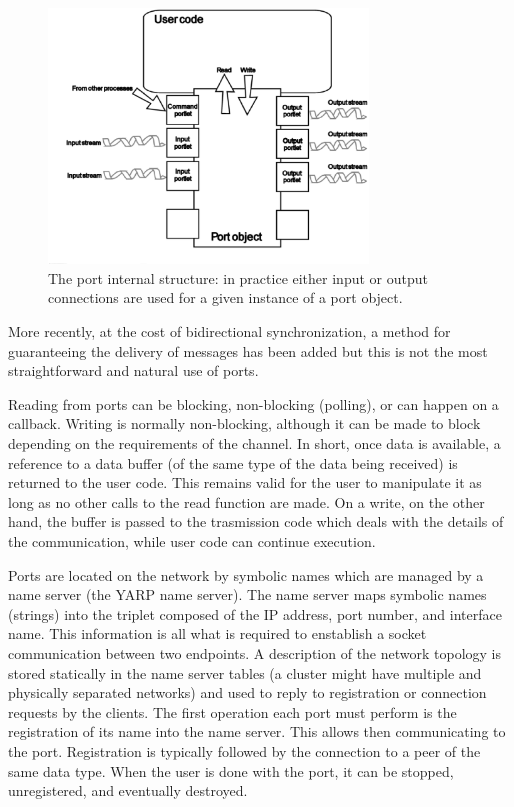 \begin{figure}
	\centering
		\includegraphics[width=8.5cm]{port.eps}
	\caption{The port internal structure: in practice either input or output connections
	are used for a given instance of a port object.}
	\label{fig:port}
\end{figure}

More recently, at the cost of bidirectional synchronization, a method for guaranteeing
the delivery of messages has been added but this is not the most straightforward and
natural use of ports.

Reading from ports can be blocking, non-blocking (polling), or can happen on a callback.
Writing is normally non-blocking, although it can be made to block depending on the requirements of the channel. In short, once data is available, a reference to a data
buffer (of the same type of the data being received) is returned to the user code. This
remains valid for the user to manipulate it as long as no other calls to the read function
are made. 
On a write, on the other hand, the buffer is passed to the trasmission code which deals
with the details of the communication, while user code can continue execution.

Ports are located on the network by symbolic names which are managed by a name server
(the YARP name server). The name server maps symbolic names (strings) into the triplet 
composed of the IP address, port number, and interface name. This information is all 
what is required to enstablish a socket communication between two endpoints. 
A description of the network topology is stored statically in the name server tables (a
cluster might have multiple and physically separated networks) and used to reply to
registration or connection requests by the clients. The first operation each port must
perform is the registration of its name into the name server. This allows then
communicating to the port. Registration is typically followed by the connection to a peer
of the same data type. When the user is done with the port, it can be stopped,
unregistered, and eventually destroyed.

